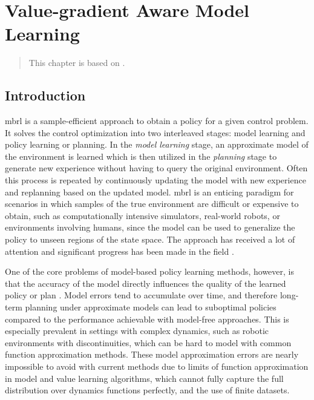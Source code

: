 \chapter{Value-gradient Aware Model Learning}
\label{chap:vagram}

\begin{quote}
    This chapter is based on .
\end{quote}

\newcommand{\revised}[1]{#1}
\section{Introduction}
\ac{mbrl} is a sample-efficient approach to obtain a policy for a given control problem. 
It solves the control optimization into two interleaved stages: model learning and policy learning or planning. 
In the \emph{model learning} stage, an approximate model of the environment is learned which is then utilized in the \emph{planning} stage to generate new experience without having to query the original environment. 
Often this process is repeated by continuously updating the model with new experience and replanning based on the updated model. 
\ac{mbrl} is an enticing paradigm for scenarios in which samples of the true environment are difficult or expensive to obtain, such as computationally intensive simulators, real-world robots, or environments involving humans, since the model can be used to generalize the policy to unseen regions of the state space. 
The approach has received a lot of attention and significant progress has been made in the field \parencite{dyna,deisenroth2011pilco,levine2013guided,hafner2020dream,moerland,schrittwieser2020mastering}.

One of the core problems of model-based policy learning methods, however, is that the accuracy of the model directly influences the quality of the learned policy or plan \parencite{schneider1997exploiting,kearns2002near,ross2012agnostic,talvitie2017self,luo2018algorithmic,mbpo}. 
Model errors tend to accumulate over time, and therefore long-term planning under approximate models can lead to suboptimal policies compared to the performance achievable with model-free approaches.
This is especially prevalent in settings with complex dynamics, such as robotic environments with discontinuities, which can be hard to model with common function approximation methods.
These model approximation errors are nearly impossible to avoid with current methods due to limits of function approximation in model and value learning algorithms, which cannot fully capture the full distribution over dynamics functions perfectly, and the use of finite datasets.

